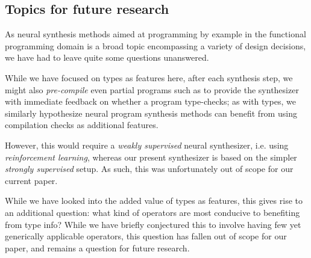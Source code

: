 \documentclass{article} %
\begin{document}
\begin{itemize}
\end{itemize}

\subsection{Topics for future research}

As neural synthesis methods aimed at programming by example in the functional
programming domain is a broad topic encompassing a variety of design decisions,
we have had to leave quite some questions unanswered.


    While we have focused on types as features here,
    after each synthesis step,
    we might also \emph{pre-compile} even partial programs such as to provide the synthesizer with immediate feedback on whether a program type-checks;
    as with types, we similarly hypothesize neural program synthesis methods can benefit from using compilation checks as additional features.

    However, this would require a \emph{weakly supervised} neural synthesizer,
    i.e. using \emph{reinforcement learning},
    whereas our present synthesizer is based on the simpler \emph{strongly supervised} setup.
    As such, this was unfortunately out of scope for our current paper.


    While we have looked into the added value of types as features,
    this gives rise to an additional question:
    what kind of operators are most conducive to benefiting from type info?
    While we have briefly conjectured this to involve having few yet generically applicable operators,
    this question has fallen out of scope for our paper,
    and remains a question for future research.
\end{document}
